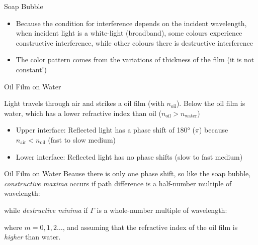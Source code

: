 \documentclass[12pt,compress,aspectratio=169]{beamer}
\begin{document}
\begin{frame}{Soap Bubble}
  \begin{center}
  \end{center}
  \begin{itemize}
  \item Because the condition for interference depends on the incident
    wavelength, when incident light is a white-light (broadband), some colours
    experience constructive interference, while other colours there is
    destructive interference
  \item The color pattern comes from the variations of thickness of the film
    (it is not constant!)
  \end{itemize}
\end{frame}



\begin{frame}{Oil Film on Water}
  \begin{center}
  \end{center}
  Light travels through air and strikes a oil film (with
  $n_\text{oil}$). Below the oil film is water, which has a lower refractive
  index than oil ($n_\text{oil}>n_\text{water}$)
  \begin{itemize}
  \item Upper interface: Reflected light has a phase shift of \ang{180} ($\pi$)
    because $n_\text{air}<n_\text{oil}$ (fast to slow medium)
  \item Lower interface: Reflected light has no phase shifts (slow to fast
    medium)
  \end{itemize}
\end{frame}



\begin{frame}{Oil Film on Water}
  Beause there is only one phase shift, so like the soap bubble,
  \emph{constructive maxima} occurs if path difference is a half-number
  multiple of wavelength:


  while \emph{destructive minima} if $\Gamma$ is a whole-number multiple of
  wavelength:


  where $m=0,1,2\ldots$, and assuming that the refractive index of the oil
  film is \emph{higher} than water.
\end{frame}
\end{document}
